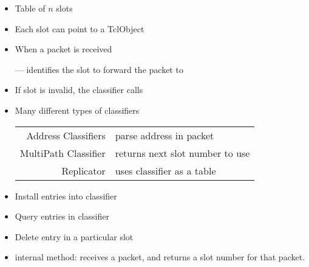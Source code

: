 \documentclass[landscape]{foils}
\begin{document}


\begin{comment}
\item Multicast Classifier, <S,G> classification
\item Replicators
\end{comment}

\begin{itemize}
\item Table of $n$ slots
\item Each slot can point to a TclObject
\item When a packet is received

  ---  identifies the slot to forward the packet to

\item If slot is invalid, the classifier calls 
\item Many different types of classifiers

  {\footnotesize
  \begin{tabularx}{\linewidth}{rX}
    Address Classifiers & parse address in packet \\
    MultiPath Classifier & returns next slot number to use \\
    Replicator & uses classifier as a table \\
  \end{tabularx}}
\end{itemize}

\begin{comment}
\item Note difference in replicator
\end{comment}

\begin{itemize}
\item Install entries into classifier
\item Query entries in classifier
  
\item Delete entry in a particular slot
\item {} internal method: receives a packet, and returns 
  a slot number for that packet.
\end{itemize}
\end{document}
